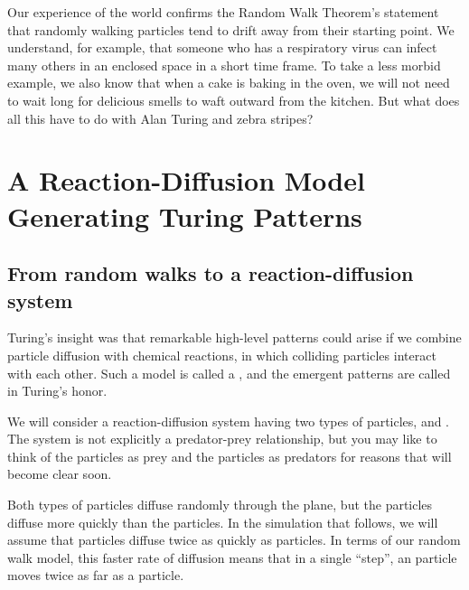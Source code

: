 Our experience of the world confirms the Random Walk Theorem's statement that randomly walking particles tend to drift away from their starting point. We understand, for example, that someone who has a respiratory virus can infect many others in an enclosed space in a short time frame. To take a less morbid example, we also know that when a cake is baking in the oven, we will not need to wait long for delicious smells to waft outward from the kitchen. But what does all this have to do with Alan Turing and zebra stripes?\\

\FloatBarrier
{}

\section{A Reaction-Diffusion Model Generating Turing Patterns}
\label{sec:a_reaction-diffusion_model_generating_turing_patterns}

\subsection{From random walks to a reaction-diffusion system}

Turing's insight was that remarkable high-level patterns could arise if we combine particle diffusion with chemical reactions, in which colliding particles interact with each other. Such a model is called a , and the emergent patterns are called  in Turing's honor.

We will consider a reaction-diffusion system having two types of particles,  and . The system is not explicitly a predator-prey relationship, but you may like to think of the  particles as prey and the  particles as predators for reasons that will become clear soon.

Both types of particles diffuse randomly through the plane, but the  particles diffuse more quickly than the  particles.  In the simulation that follows, we will assume that  particles diffuse twice as quickly as  particles. In terms of our random walk model, this faster rate of diffusion means that in a single ``step'', an  particle moves twice as far as a  particle.\\

